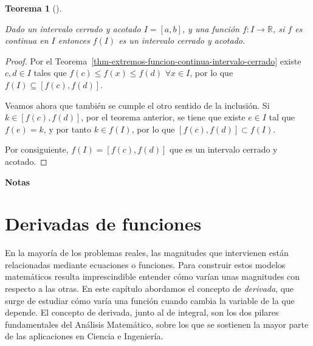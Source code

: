\documentclass[
  a4paper,
]{scrreport}
\theoremstyle{definition}
\theoremstyle{plain}
\theoremstyle{definition}
\theoremstyle{definition}
\theoremstyle{plain}
\newtheorem{theorem}{Teorema}[chapter]
\theoremstyle{plain}
\theoremstyle{remark}
\begin{document}
\begin{theorem}[]\protect\hypertarget{thm-imagen-funcion-continua-intervalo-cerrado-acotado}{}\label{thm-imagen-funcion-continua-intervalo-cerrado-acotado}

Dado un intervalo cerrado y acotado \(I=[a,b]\), y una función
\(f:I\to\mathbb{R}\), si \(f\) es continua en \(I\) entonces \(f(I)\) es
un intervalo cerrado y acotado.

\end{theorem}

\begin{tcolorbox}[enhanced jigsaw, leftrule=.75mm, colbacktitle=quarto-callout-note-color!10!white, toprule=.15mm, opacityback=0, opacitybacktitle=0.6, toptitle=1mm, breakable, bottomtitle=1mm, colframe=quarto-callout-note-color-frame, rightrule=.15mm, titlerule=0mm, title=\textcolor{quarto-callout-note-color}{\faInfo}\hspace{0.5em}{Demostración}, arc=.35mm, left=2mm, bottomrule=.15mm, colback=white, coltitle=black]

\begin{proof}
Por el Teorema~\ref{thm-extremos-funcion-continua-intervalo-cerrado}
existe \(c,d\in I\) tales que \(f(c)\leq f(x)\leq f(d)\)
\(\forall x\in I\), por lo que \(f(I)\subseteq[f(c), f(d)]\).

Veamos ahora que también se cumple el otro sentido de la inclusión. Si
\(k\in[f(c),f(d)]\), por el teorema anterior, se tiene que existe
\(e\in I\) tal que \(f(e)=k\), y por tanto \(k\in f(I)\), por lo que
\([f(c),f(d)]\subset f(I)\).

Por consiguiente, \(f(I)=[f(c),f(d)]\) que es un intervalo cerrado y
acotado.
\end{proof}

\end{tcolorbox}

\textbf{Notas}


\chapter{Derivadas de funciones}\label{derivadas-de-funciones}

En la mayoría de los problemas reales, las magnitudes que intervienen
están relacionadas mediante ecuaciones o funciones. Para construir estos
modelos matemáticos resulta imprescindible entender cómo varían unas
magnitudes con respecto a las otras. En este capítulo abordamos el
concepto de \emph{derivada}, que surge de estudiar cómo varía una
función cuando cambia la variable de la que depende. El concepto de
derivada, junto al de integral, son los dos pilares fundamentales del
Análisis Matemático, sobre los que se sostienen la mayor parte de las
aplicaciones en Ciencia e Ingeniería.
\end{document}
